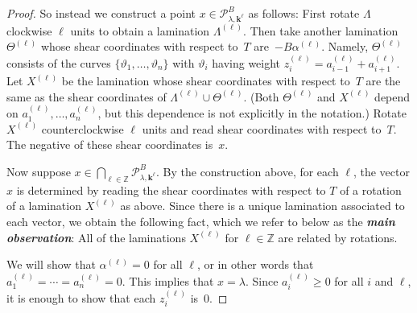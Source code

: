 \documentclass{amsart}
\theoremstyle{definition}
\theoremstyle{remark}
\numberwithin{equation}{section}
\newcommand{\newword}[1]{\textbf{\emph{#1}}}
\newcommand{\integers}{\mathbb Z}
\newcommand{\thet}{\vartheta}
\newcommand{\set}[1]{{\lbrace #1 \rbrace}}
\newcommand{\0}{{\mathbf{0}}}
\newcommand{\kk}{{\boldsymbol{k}}}
\renewcommand{\P}{\mathcal{P}}
\begin{document}
\begin{proof}
So instead we construct a point $x\in \P^B_{\lambda,\kk^\ell}$ as follows:
First rotate $\Lambda$ clockwise $\ell$ units to obtain a lamination $\Lambda^{(\ell)}$.
Then take another lamination $\Theta^{(\ell)}$ whose shear coordinates with respect to~$T$ are~$-B\alpha^{(\ell)}$.
Namely, $\Theta^{(\ell)}$ consists of the curves $\set{\thet_1,\ldots,\thet_n}$ with $\thet_i$ having weight $z_i^{(\ell)}=a_{i-1}^{(\ell)}+a_{i+1}^{(\ell)}$. 
Let $X^{(\ell)}$ be the lamination whose shear coordinates with respect to~$T$ are the same as the shear coordinates of $\Lambda^{(\ell)}\cup\Theta^{(\ell)}$.
(Both $\Theta^{(\ell)}$ and $X^{(\ell)}$ depend on $a_1^{(\ell)},\ldots,a_n^{(\ell)}$, but this dependence is not explicitly in the notation.)
Rotate $X^{(\ell)}$ counterclockwise $\ell$ units and read shear coordinates with respect to~$T$.
The negative of these shear coordinates is~$x$.

Now suppose $x\in\bigcap_{\ell\in\integers}\P^B_{\lambda,\kk^\ell}$.
By the construction above, for each $\ell$, the vector $x$ is determined by reading the shear coordinates with respect to $T$ of a rotation of a lamination $X^{(\ell)}$ as above.
Since there is a unique lamination associated to each vector, we obtain the following fact, which we refer to below as the \newword{main observation}:
All of the laminations $X^{(\ell)}$ for $\ell\in\integers$ are related by rotations.

We will show that $\alpha^{(\ell)}=0$ for all $\ell$, or in other words that $a_1^{(\ell)}=\cdots=a_n^{(\ell)}=0$.
This implies that $x=\lambda$.
Since $a_i^{(\ell)}\ge 0$ for all $i$ and $\ell$, it is enough to show that each $z_i^{(\ell)}$ is~$0$.


\end{proof}
\end{document}
